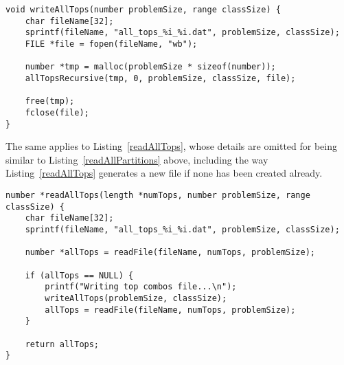 \begin{lstlisting}[caption={Writing all tops to a file.},label={writeAllTops}]
void writeAllTops(number problemSize, range classSize) {
    char fileName[32];
    sprintf(fileName, "all_tops_%i_%i.dat", problemSize, classSize);
    FILE *file = fopen(fileName, "wb");

    number *tmp = malloc(problemSize * sizeof(number));
    allTopsRecursive(tmp, 0, problemSize, classSize, file);

    free(tmp);
    fclose(file);
}
\end{lstlisting}

The same applies to Listing~\ref{readAllTops}, whose details are omitted for being similar to Listing~\ref{readAllPartitions} above, including the way Listing~\ref{readAllTops} generates a new file if none has been created already.

\begin{lstlisting}[caption={Reading all tops from a file.},label={readAllTops}]
number *readAllTops(length *numTops, number problemSize, range classSize) {
    char fileName[32];
    sprintf(fileName, "all_tops_%i_%i.dat", problemSize, classSize);

    number *allTops = readFile(fileName, numTops, problemSize);

    if (allTops == NULL) {
        printf("Writing top combos file...\n");
        writeAllTops(problemSize, classSize);
        allTops = readFile(fileName, numTops, problemSize);
    }

    return allTops;
}
\end{lstlisting}


